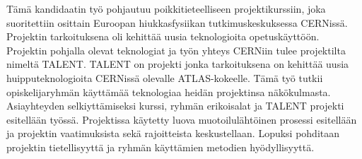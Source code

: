 \documentclass[english,12pt,a4paper,dvips]{article}
\begin{document}

\begin{otherlanguage}{finnish}
\begin{abstractpage}[finnish]

  Tämä kandidaatin työ pohjautuu poikkitieteelliseen projektikurssiin, joka suoritettiin osittain Euroopan hiukkasfysiikan tutkimuskeskuksessa CERNissä. Projektin tarkoituksena oli kehittää uusia teknologioita opetuskäyttöön. Projektin pohjalla olevat teknologiat ja työn yhteys CERNiin tulee projektilta nimeltä TALENT. TALENT on projekti jonka tarkoituksena on kehittää uusia huipputeknologioita CERNissä olevalle ATLAS-kokeelle. Tämä työ tutkii opiskelijaryhmän käyttämää teknologiaa heidän projektinsa näkökulmasta. Asiayhteyden selkiyttämiseksi kurssi, ryhmän erikoisalat ja TALENT projekti esitellään työssä. Projektissa käytetty luova muotoilulähtöinen prosessi esitellään ja projektin vaatimuksista sekä rajoitteista keskustellaan. Lopuksi pohditaan projektin tietellisyyttä ja ryhmän käyttämien metodien hyödyllisyyttä. 
  
  
\end{abstractpage}
\end{otherlanguage}
\newpage
%






\end{document}
